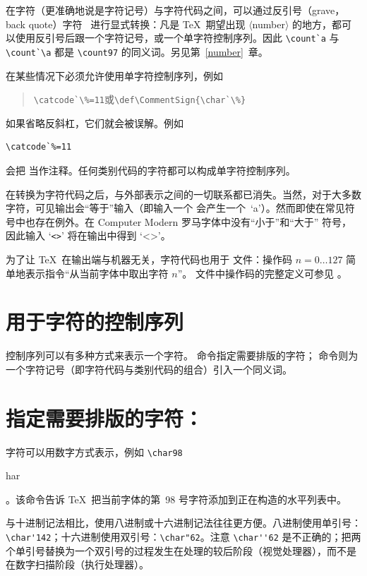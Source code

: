 \documentclass[a4paper]{rapport3}
\makeatletter
\def\gr#1{$\langle$#1$\rangle$}\def\key#1{{\tt#1}}
\newenvironment{disp}{\begin{quotation}}{\end{quotation}}
\def\gram#1{\gr{#1}}%
\def\cstoidx#1\par{\index{#1@\cs{#1}}}
\makeatother
\begin{document}
在字符（更准确地说是字符记号）与字符代码之间，可以通过反引号（grave，back quote）字符~ 进行显式转换：凡是 \TeX\ 期望出现 \gram{number} 的地方，都可以使用反引号后跟一个字符记号，或一个单字符控制序列。因此 \verb.\count`a. 与 \verb.\count`\a. 都是 \awp
\verb.\count97. 的同义词。另见第~\ref{number}~章。

在某些情况下必须允许使用单字符控制序列，例如
\begin{disp}\verb>\catcode`\%=11>\quad 或\quad \verb>\def\CommentSign{\char`\%}>\end{disp}
如果省略反斜杠，它们就会被误解。例如
\begin{verbatim}
\catcode`%=11
\end{verbatim}
会把  当作注释。任何类别代码的字符都可以构成单字符控制序列。

在转换为字符代码之后，与外部表示之间的一切联系都已消失。当然，对于大多数字符，可见输出会“等于”输入（即输入一个  会产生一个~`a'）。然而即使在常见符号中也存在例外。在 Computer Modern 罗马字体中没有“小于”和“大于”
%
符号，因此输入 `\verb.<>.' 将在输出中得到 `<>'。

为了让 \TeX\ 在输出端与机器无关，字符代码也用于  文件：操作码 $n=0\ldots127$ 简单地表示指令“从当前字体中取出字符 $n$”。 文件中操作码的完整定义可参见 \cite{Knuth:TeXprogram}。


\section{用于字符的控制序列}

控制序列可以有多种方式来表示一个字符。 命令指定需要排版的字符； 命令则为一个字符记号（即字符代码与类别代码的组合）引入一个同义词。

\section{指定需要排版的字符：\protect{}}

字符可以用数字方式表示，例如 \verb.\char98.\cstoidx char\par。该命令告诉 \TeX\ 把当前字体的第~98 号字符添加到正在构造的水平列表中。

与十进制记法相比，使用八进制或十六进制记法往往更方便。八进制使用单引号：\verb.\char'142.；十六进制使用双引号：\verb.\char"62.。注意 \verb.\char''62. 是不正确的；把两个单引号替换为一个双引号的过程发生在处理的较后阶段（视觉处理器），而不是在数字扫描阶段（执行处理器）。
\end{document}

